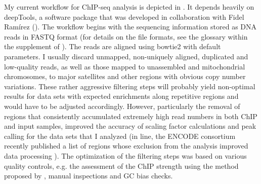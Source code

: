 My current workflow for ChIP-seq analysis is depicted in . It depends heavily on deepTools, a software package that was developed in collaboration with Fidel Ramírez \citep{Ramirez2014} (). The workflow begins with the sequencing information stored as DNA reads in FASTQ format (for details on the file formats, see the glossary within the supplement of ). The reads are aligned using bowtie2 \citep{Langmead2012} with default parameters. I usually discard unmapped, non-uniquely aligned, duplicated and low-quality reads, as well as those mapped to unassembled and mitochondrial chromosomes, to major satellites and other regions with obvious copy number variations. These rather aggressive filtering steps will probably yield non-optimal results for data sets with expected enrichments along repetitive regions and would have to be adjusted accordingly. However, particularly the removal of regions that consistently accumulated extremely high read numbers in both ChIP and input samples, improved the accuracy of scaling factor calculations and peak calling for the data sets that I analyzed (in line, the ENCODE consortium recently published a list of regions whose exclusion from the analysis improved data processing \citep{Blacklists, Carroll2014}). The optimization of the filtering steps was based on various quality controls, e.g. the assessment of the ChIP strength using the method proposed by \citet{Diaz2012}, manual inspections and GC bias checks.
%
